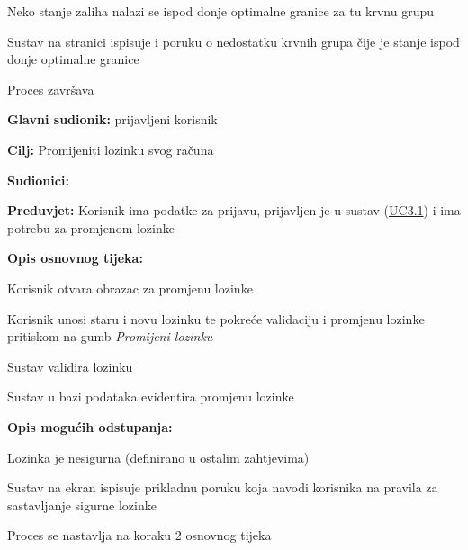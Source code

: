 \begin{packed_item}
\begin{packed_item}
							\item[5] Neko stanje zaliha nalazi se ispod donje optimalne granice za tu krvnu grupu 
							\begin{packed_enum}
								\item Sustav na stranici ispisuje i poruku o nedostatku krvnih grupa čije je stanje ispod donje optimalne granice
								\item Proces završava
							\end{packed_enum}
							
						\end{packed_item}
						
					\end{packed_item}
					
					
					\noindent {}
					\begin{packed_item}
	
						\item \textbf{Glavni sudionik: }prijavljeni korisnik
						\item  \textbf{Cilj:} Promijeniti lozinku svog računa
						\item  \textbf{Sudionici:} 
						\item  \textbf{Preduvjet:} Korisnik ima podatke za prijavu, prijavljen je u sustav (\hyperref[UC3.1]{UC3.1}) i ima potrebu za promjenom lozinke
						\item  \textbf{Opis osnovnog tijeka:}
						
						\item[] \begin{packed_enum}
	                        \item Korisnik otvara obrazac za promjenu lozinke
	                        \item Korisnik unosi staru i novu lozinku te pokreće validaciju i promjenu lozinke pritiskom na gumb \textit{Promijeni lozinku}
	                        \item Sustav validira lozinku
	                        \item Sustav u bazi podataka evidentira promjenu lozinke
						\end{packed_enum}
						
						\item  \textbf{Opis mogućih odstupanja:}
						
						\item[] \begin{packed_item}
	
							\item[3] Lozinka je nesigurna (definirano u ostalim zahtjevima)
							\begin{packed_enum}
								\item Sustav na ekran ispisuje prikladnu poruku koja navodi korisnika na pravila za sastavljanje sigurne lozinke
								\item Proces se nastavlja na koraku 2 osnovnog tijeka
							\end{packed_enum}
							
						\end{packed_item}
						
					\end{packed_item}
					
